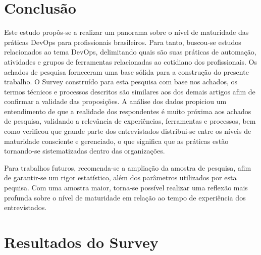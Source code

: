 \documentclass[twoside,english,brazilian]{UNISINOSartigo}
\begin{document}
\section{Conclusão}
Este estudo propôs-se a realizar um panorama sobre o nível de maturidade das práticas DevOps para profissionais brasileiros. Para tanto, buscou-se estudos relacionados ao tema DevOps, delimitando quais são suas práticas de automação, atividades e grupos de ferramentas relacionadas ao cotidiano dos profissionais. Os achados de pesquisa forneceram uma base sólida para a construção do presente trabalho. O Survey construído para esta pesquisa com base nos achados, os termos técnicos e processos descritos são similares aos dos demais artigos afim de confirmar a validade das proposições. A análise dos dados propiciou um entendimento de que a realidade dos respondentes é muito próxima aos achados de pesquisa, validando a relevância de experiências, ferramentas e processos, bem como verificou que grande parte dos entrevistados distribui-se entre os níveis de maturidade consciente e gerenciado, o que significa que as práticas estão tornando-se sistematizadas dentro das organizações.

Para trabalhos futuros, recomenda-se a ampliação da amostra de pesquisa, afim de garantir-se um rigor estatístico, além dos parâmetros utilizados por esta pequisa. Com uma amostra maior, torna-se possível realizar uma reflexão mais profunda sobre o nível de maturidade em relação ao tempo de experiência dos entrevistados.

%










\appendix



\section{Resultados do Survey}
\end{document}
